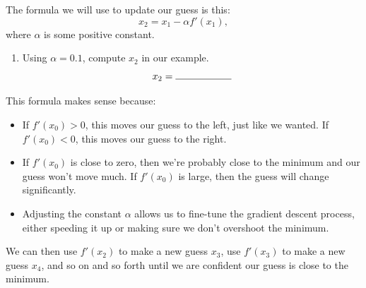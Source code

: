 \documentclass[11pt]{article}
\begin{document}
The formula we will use to update our guess is this:
\[
    x_2 = x_1 - \alpha f'(x_1),
\]
where $\alpha$ is some positive constant.
\begin{enumerate}
    \item[2.]  Using $\alpha = 0.1$, compute $x_2$ in our example.
    \[
        x_2 = \rule{2cm}{0.4pt}
    \]
\end{enumerate}
\newpage
This formula makes sense because:
\begin{itemize}
    \item If $f'(x_0)>0$, this moves our guess to the left, just like we wanted. If $f'(x_0) < 0$, this moves our guess to the right.
    \item If $f'(x_0)$ is close to zero, then we're probably close to the minimum and our guess won't move much. If $f'(x_0)$ is large, then the guess will change significantly.
    \item Adjusting the constant $\alpha$ allows us to fine-tune the gradient descent process, either speeding it up or making sure we don't overshoot the minimum.
\end{itemize}
We can then use $f'(x_2)$ to make a new guess $x_3$, use $f'(x_3)$ to make a new guess $x_4$, and so on and so forth until we are confident our guess is close to the minimum.
\end{document}
